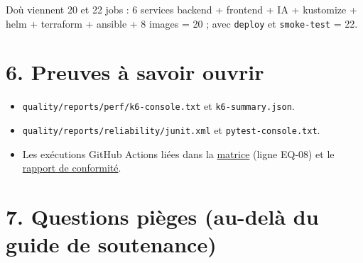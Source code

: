 \documentclass[
  11pt,
]{article}
\providecommand{\tightlist}{%
  \setlength{\itemsep}{0pt}\setlength{\parskip}{0pt}}
\begin{document}
D\textquotesingle où viennent 20 et 22 jobs : 6 services backend +
frontend + IA + kustomize + helm + terraform + ansible + 8 images = 20 ;
avec \texttt{deploy} et \texttt{smoke-test} = 22.

\section{6. Preuves à savoir ouvrir}\label{6-preuves-uxe0-savoir-ouvrir}

\begin{itemize}
\tightlist
\item
  \texttt{quality/}\allowbreak{}\texttt{reports/}\allowbreak{}\texttt{perf/}\allowbreak{}\texttt{k6-}\allowbreak{}\texttt{console.}\allowbreak{}\texttt{txt}
  et \texttt{k6-summary.json}.
\item
  \texttt{quality/}\allowbreak{}\texttt{reports/}\allowbreak{}\texttt{reliability/}\allowbreak{}\texttt{junit.}\allowbreak{}\texttt{xml}
  et \texttt{pytest-console.txt}.
\item
  Les exécutions GitHub Actions liées dans la
  \href{MATRICE_TRACABILITE.pdf}{matrice} (ligne EQ‑08) et le
  \href{RAPPORT_CONFORMITE_ISO25010.pdf}{rapport de conformité}.
\end{itemize}

\section{7. Questions pièges (au-delà du guide de
soutenance)}\label{7-questions-piuxe8ges-au-deluxe0-du-guide-de-soutenance}
\end{document}
